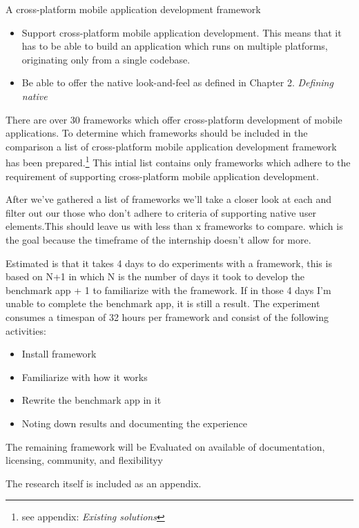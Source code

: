 
A cross-platform mobile application development framework
\begin{itemize}
\item Support cross-platform mobile application development. This means that it has to be able to build an application which runs on multiple platforms, originating only from a single codebase.
\item Be able to offer the native look-and-feel as defined in Chapter  2. \emph{Defining native}
\end{itemize}



There are over 30 frameworks which offer cross-platform development of mobile applications\cite{Wikipedia2012}. To determine which frameworks should be included in the comparison a list of cross-platform mobile application development framework has been prepared.\footnote{see appendix: \emph{Existing solutions}} This intial list contains only frameworks which adhere to the requirement of supporting cross-platform mobile application development.

After we've gathered a list of frameworks we'll take a closer look at each and filter out our those who don't adhere to criteria of supporting native user elements.This should leave us with less than x frameworks to compare. which is the goal because the timeframe of the internship doesn't allow for more. 


Estimated is that it takes 4 days to do experiments with a framework, this is based on N+1 in which N is the number of days it took to develop the benchmark app + 1 to familiarize with the framework. If in those 4 days I'm unable to complete the benchmark app, it is still a result. The experiment consumes a timespan of 32 hours per framework and consist of the following activities:

\begin{itemize}
\item Install framework
\item Familiarize with how it works
\item Rewrite the benchmark app in it
\item Noting down results and documenting the experience
\end{itemize}

The remaining framework will be Evaluated on available of documentation, licensing, community, and flexibilityy

The research itself is included as an appendix.

